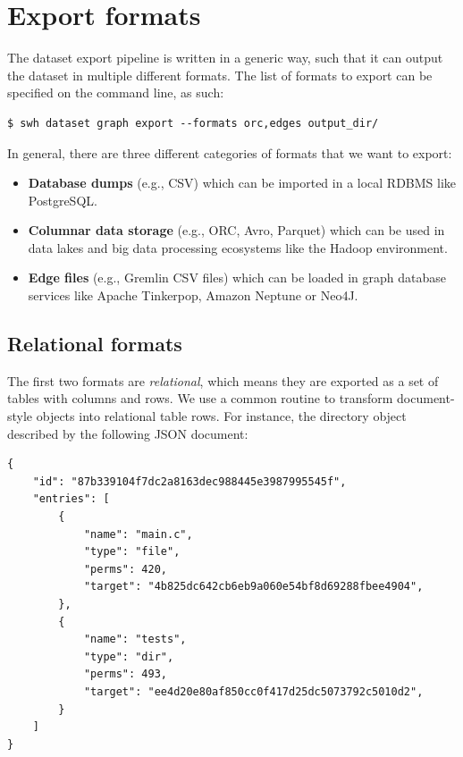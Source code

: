 \section{Export formats}

The dataset export pipeline is written in a generic way, such that it can
output the dataset in multiple different formats. The list of formats to export
can be specified on the command line, as such:

\begin{verbatim}
$ swh dataset graph export --formats orc,edges output_dir/
\end{verbatim}

In general, there are three different categories of formats that we want to
export:

\begin{itemize}
    \item \textbf{Database dumps} (e.g., CSV) which can be imported in a local
        \gls{RDBMS} like PostgreSQL.
    \item \textbf{Columnar data storage} (e.g., ORC, Avro, Parquet) which can
        be used in data lakes and big data processing ecosystems like the
        Hadoop environment.
    \item \textbf{Edge files} (e.g., Gremlin CSV files) which can
        be loaded in graph database services like Apache Tinkerpop, Amazon
        Neptune or Neo4J.
\end{itemize}

\subsection{Relational formats}
The first two formats are \emph{relational}, which means they are exported as a
set of tables with columns and rows. We use a common routine to transform
document-style objects into relational table rows. For instance, the directory
object described by the following JSON document:

{\footnotesize
\begin{verbatim}
{
    "id": "87b339104f7dc2a8163dec988445e3987995545f",
    "entries": [
        {
            "name": "main.c",
            "type": "file",
            "perms": 420,
            "target": "4b825dc642cb6eb9a060e54bf8d69288fbee4904",
        },
        {
            "name": "tests",
            "type": "dir",
            "perms": 493,
            "target": "ee4d20e80af850cc0f417d25dc5073792c5010d2",
        }
    ]
}
\end{verbatim}
}

